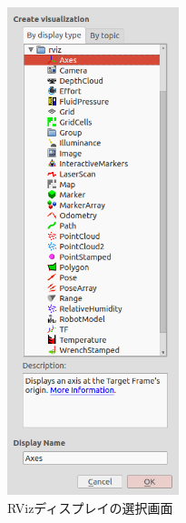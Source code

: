 \begin{figure}[h]
  \centering
  \includegraphics[width=5cm]{pictures/chapter5/pic_05_06.png}
  \caption{RVizディスプレイの選択画面}
\end{figure}

